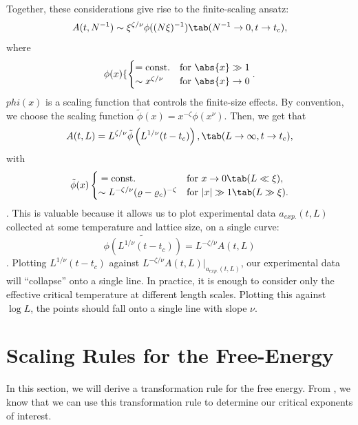 Together, these considerations give rise to the finite-scaling
ansatz:
\begin{equation}%
  A(t,N^{-1})\sim \xi^{\zeta/\nu} \phi((N\xi)^{-1})\tab (N^{-1}\rightarrow 0, t\rightarrow t_c),
\end{equation}%
where
\begin{equation}%
  \phi(x)\{
  \begin{cases}
    = \text{const.} &\text{for } \abs{x}\gg 1 \\
    \sim x^{\zeta/\nu} &\text{for } \abs{x}\rightarrow 0\\
  \end{cases}.
\end{equation}%
$phi(x)$ is a scaling function that controls the finite-size
effects. By convention, we choose the scaling function
$\tilde{\phi}(x)=x^{-\zeta}\phi(x^\nu)$. Then, we get that%
\begin{equation}%
  A(t,L) = L^{\zeta/\nu} \tilde{\phi}\left(L^{1/\nu} (t - t_c)\right), \tab (L \rightarrow \infty, t \rightarrow t_c),
\end{equation}%
with
\begin{equation}%
  \tilde{\phi}(x)
  \begin{cases}{}
    = \text{const.} & \text{for } x \to 0\tab  (L \ll \xi), \\
    \sim L^{-\zeta/\nu} (\varrho - \varrho_c)^{-\zeta} & \text{for }
    |x| \gg 1
    \tab (L \gg \xi).\\
  \end{cases}
\end{equation}.%
This is valuable because it allows us to plot
experimental data $a_{exp.}(t,L)$ collected at some temperature and lattice
size, on a single curve:%
\begin{equation}%
  \tilde{\phi(L^{1/\nu}(t-t_c))}=L^{-\zeta/\nu}A(t,L)
\end{equation}.%
Plotting $L^{1/\nu}(t-t_c)$ against $L^{-\zeta/\nu}A(t,L)|_{a_{exp.}(t,L)}$, our experimental data will ``collapse'' onto a single line.
In practice, it is enough to consider only the effective critical temperature
at different length scales. Plotting this against $\log L$, the points should
fall onto a single line with slope $\nu$.

\section{Scaling Rules for the
  Free-Energy}\label{sec:free-energy-scaling}
In this section, we will derive a transformation rule for the free
energy. From , we know that we can use this
transformation rule to determine our critical exponents of interest.

